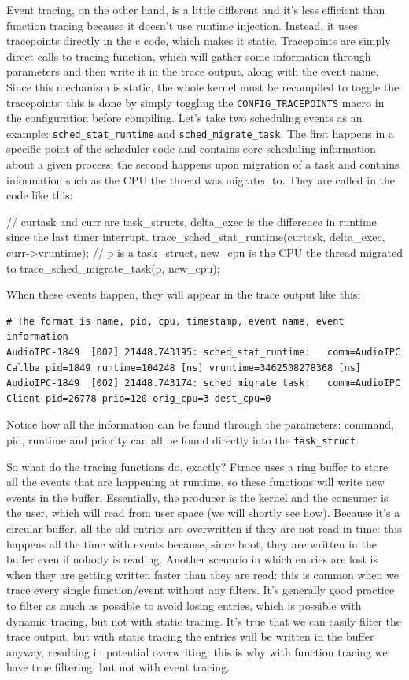 Event tracing, on the other hand, is a little different and it's less efficient than function tracing because it doesn't use runtime injection. Instead, it uses tracepoints directly in the c code, which makes it static. Tracepoints are simply direct calls to tracing function, which will gather some information through parameters and then write it in the trace output, along with the event name. Since this mechanism is static, the whole kernel must be recompiled to toggle the tracepoints: this is done by simply toggling the \verb|CONFIG_TRACEPOINTS| macro in the configuration before compiling. Let's take two scheduling events as an example: \verb|sched_stat_runtime| and \verb|sched_migrate_task|. The first happens in a specific point of the scheduler code and contains core scheduling information about a given process; the second happens upon migration of a task and contains information such as the CPU the thread was migrated to. They are called in the code like this:
\begin{code}
// curtask and curr are task_structs, delta_exec is the difference in runtime since the last timer interrupt. 
trace_sched_stat_runtime(curtask, delta_exec, curr->vruntime);
// p is a task_struct, new_cpu is the CPU the thread migrated to
trace_sched_migrate_task(p, new_cpu);
\end{code}
When these events happen, they will appear in the trace output like this:
\begin{Verbatim}[xleftmargin=-2cm,fontsize=\footnotesize]
# The format is name, pid, cpu, timestamp, event name, event information 
AudioIPC-1849  [002] 21448.743195: sched_stat_runtime:   comm=AudioIPC Callba pid=1849 runtime=104248 [ns] vruntime=3462508278368 [ns]
AudioIPC-1849  [002] 21448.743174: sched_migrate_task:   comm=AudioIPC Client pid=26778 prio=120 orig_cpu=3 dest_cpu=0
\end{Verbatim} 

Notice how all the information can be found through the parameters: command, pid, runtime and priority can all be found directly into the \verb|task_struct|.

So what do the tracing functions do, exactly? Ftrace uses a ring buffer to store all the events that are happening at runtime, so these functions will write new events in the buffer. Essentially, the producer is the kernel and the consumer is the user, which will read from user space (we will shortly see how). Because it's a circular buffer, all the old entries are overwritten if they are not read in time: this happens all the time with events because, since boot, they are written in the buffer even if nobody is reading. Another scenario in which entries are lost is when they are getting written faster than they are read: this is common when we trace every single function/event without any filters. It's generally good practice to filter as much as possible to avoid losing entries, which is possible with dynamic tracing, but not with static tracing. It's true that we can easily filter the trace output, but with static tracing the entries will be written in the buffer anyway, resulting in potential overwriting: this is why with function tracing we have true filtering, but not with event tracing.

